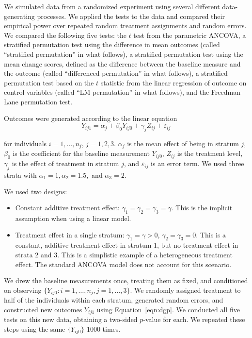 \documentclass[12pt]{article}
\newcommand{\todo}[1]{{\color{red}{TO DO: \sc #1}}}
\begin{document}
We simulated data from a randomized experiment using several different data-generating processes.
We applied the tests to the data and compared their empirical power over repeated random treatment assignments and random errors.
We compared the following five tests:
the $t$ test from the parametric ANCOVA,
a stratified permutation test using the difference in mean outcomes
 (called ``stratified permutation'' in what follows),
a stratified permutation test using the mean change scores, defined as the difference between the baseline measure and the outcome (called ``differenced permutation'' in what follows),
a stratified permutation test based on the $t$ statistic from the linear regression of outcome on control variables (called ``LM permutation'' in what follows),
and the Freedman-Lane permutation test.
 \todo{supplementary ref}


Outcomes were generated according to the linear equation 
\begin{equation}\label{eqn:dgp}
Y_{ij1} =\alpha_j + \beta_0Y_{ij0} + \gamma_j Z_{ij} + \varepsilon_{ij}
\end{equation}

\noindent for individuals $i = 1, \dots, n_j$, $j = 1, 2, 3$.
$\alpha_j$ is the mean effect of being in stratum $j$, 
$\beta_0$ is the coefficient for the baseline measurement $Y_{ij0}$, 
$Z_{ij}$ is the treatment level, 
$\gamma_j$ is the effect of treatment in stratum $j$, 
and $\varepsilon_{ij}$ is an error term.
We used three strata with $\alpha_1 = 1, \alpha_2 = 1.5,$ and $\alpha_3 = 2$.

We used two designs:
\begin{itemize}
\item Constant additive treatment effect: $\gamma_1 = \gamma_2 = \gamma_3 = \gamma$. This is the implicit assumption when using a linear model.
\item Treatment effect in a single stratum: $\gamma_1 = \gamma > 0$, $\gamma_2 = \gamma_3 = 0$. This is a constant, additive treatment effect in stratum 1, but no treatment effect in strata 2 and 3. This is a simplistic example of a heterogeneous treatment effect. The standard ANCOVA model does not account for this scenario.
\end{itemize}

\noindent We drew the baseline measurements once, treating them as fixed, and conditioned on observing $\{ Y_{ij0} : {i = 1,\dots,n_j, j = 1,\dots, 3}\}$.
We randomly assigned treatment to half of the individuals within each stratum, generated random errors, and constructed new outcomes $Y_{ij1}$ using Equation~\ref{eqn:dgp}.
We conducted all five tests on this new data, obtaining a two-sided $p$-value for each.
We repeated these steps using the same $\{ Y_{ij0} \}$ 1000 times.
\end{document}
